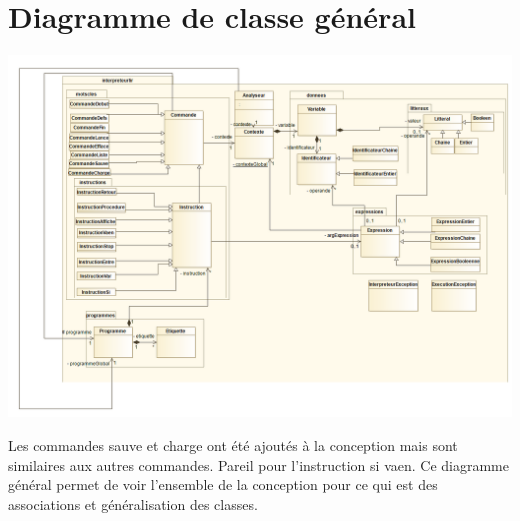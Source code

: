 \section{Diagramme de classe général}
\includegraphics[scale=0.35]{./img/COO/COO_prototype_3/Scéma général simplifié}
\par Les commandes sauve et charge ont été ajoutés à la conception mais sont similaires aux autres commandes. Pareil pour l'instruction si vaen. Ce diagramme général permet de voir l'ensemble de la conception pour ce qui est des associations et généralisation des classes.